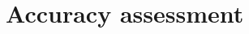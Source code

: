 
\lhead[\fancyplain{}{\leftmark}]%
      {\fancyplain{}{}} %
\chead[\fancyplain{}{}]%
      {\fancyplain{}{}}
\rhead[\fancyplain{}{}]%
      {\fancyplain{}{\rightmark}}%
\lfoot[\fancyplain{}{}]%
      {\fancyplain{}{}}
\cfoot[\fancyplain{}{\thepage}]%
      {\fancyplain{}{\thepage}} %
\rfoot[\fancyplain{}{}]%
     {\fancyplain{}{\scriptsize}}
     
\addto{}


\chapter{Accuracy assessment}
\label{ch:5}


